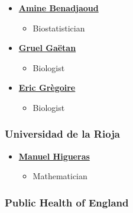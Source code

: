 \documentclass[]{scrartcl}
\providecommand{\tightlist}{%
  \setlength{\itemsep}{0pt}\setlength{\parskip}{0pt}}
\begin{document}
\begin{itemize}
\tightlist
\item
  \textbf{\href{https://www.researchgate.net/profile/Mohamed_Benadjaoud}{Amine Benadjaoud}}

  \begin{itemize}
  \tightlist
  \item
    Biostatistician
  \end{itemize}
\item
  \textbf{\href{https://www.researchgate.net/profile/Gruel_Gaetan}{Gruel Gaëtan}}

  \begin{itemize}
  \tightlist
  \item
    Biologist
  \end{itemize}
\item
  \textbf{\href{https://www.researchgate.net/profile/Eric_Gregoire2}{Eric Grègoire}}

  \begin{itemize}
  \tightlist
  \item
    Biologist
  \end{itemize}
\end{itemize}

\hypertarget{universidad-de-la-rioja}{%
\subsubsection*{Universidad de la Rioja}\label{universidad-de-la-rioja}}

\begin{itemize}
\tightlist
\item
  \textbf{\href{https://investigacion.unirioja.es/investigadores/1322/detalle}{Manuel Higueras}}

  \begin{itemize}
  \tightlist
  \item
    Mathematician
  \end{itemize}
\end{itemize}

\hypertarget{public-health-of-england}{%
\subsubsection*{Public Health of England}\label{public-health-of-england}}
\end{document}
